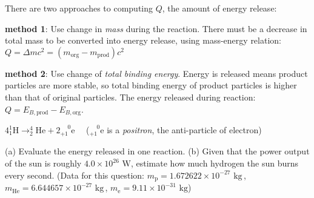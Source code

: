 There are two approaches to computing $Q$, the amount of energy release:

\noindent \textbf{method 1}: Use change in \emph{mass} during the reaction.
There must be a decrease in total mass to be converted into energy release, using mass-energy relation: $Q=\Delta mc^2 = (m_\text{org} - m_\text{prod})c^2$

\noindent \textbf{method 2}: Use change of \emph{total binding energy}.
Energy is released means product particles are more stable, so total binding energy of product particles is higher than that of original particles. The energy released during reaction: $Q= E_{B,\text{prod}} - E_{B,\text{org}}$.


{

\centering

$4 ^1_1\text{H} \longrightarrow ^4_2\text{He} + 2 ^{\phantom{+}0}_{+1}\text{e} \quad$ ($^{\phantom{+}0}_{+1}\text{e}$ is a \emph{positron}, the anti-particle of electron)

}

\noindent (a) Evaluate the energy released in one reaction. (b) Given that the power output of the sun is roughly $4.0\times10^{26}\text{ W}$, estimate how much hydrogen the sun burns every second. (Data for this question: $m_\text{p}=1.672622\times10^{-27}\text{ kg} \,$, $m_\text{He}=6.644657\times10^{-27}\text{ kg} \,$,  $m_\text{e}=9.11\times10^{-31}\text{ kg}$)



